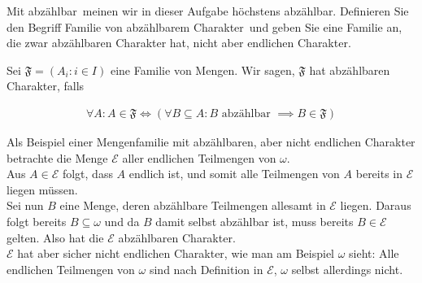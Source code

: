 
\begin{exercise}[278]

Mit \glqq abzählbar\grqq\  meinen wir in dieser Aufgabe \glqq höchstens abzählbar\grqq.
Definieren Sie den Begriff \glqq Familie von abzählbarem Charakter\grqq\ und geben
Sie eine Familie an, die zwar abzählbaren Charakter hat, nicht aber endlichen Charakter.

\end{exercise}


\begin{solution}

Sei $\mathfrak{F} = (A_i: i \in I)$ eine Familie von Mengen. Wir sagen, $\mathfrak{F}$
hat abzählbaren Charakter, falls

\begin{align*}
  \forall A: A \in \mathfrak{F} \iff (\forall B \subseteq A: B \text{ abzählbar } \implies B \in \mathfrak{F})
\end{align*}

Als Beispiel einer Mengenfamilie mit abzählbaren, aber nicht endlichen Charakter
betrachte die Menge $\mathcal{E}$ aller endlichen Teilmengen von $\omega$. \\
Aus $A \in \mathcal{E}$ folgt, dass $A$ endlich ist, und somit alle Teilmengen
von $A$ bereits in $\mathcal{E}$ liegen müssen. \\
Sei nun $B$ eine Menge, deren abzählbare Teilmengen allesamt in $\mathcal{E}$
liegen. Daraus folgt bereits $B \subseteq \omega$ und da $B$ damit selbst abzählbar ist,
muss bereits $B \in \mathcal{E}$ gelten. Also hat die $\mathcal{E}$ abzählbaren
Charakter. \\
$\mathcal{E}$ hat aber sicher nicht endlichen Charakter, wie man am Beispiel $\omega$
sieht: Alle endlichen Teilmengen von $\omega$ sind nach Definition in $\mathcal{E}$,
$\omega$ selbst allerdings nicht.
\end{solution}


